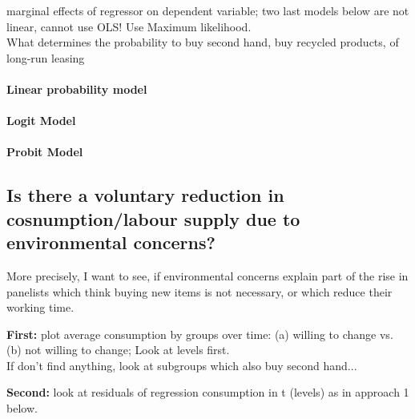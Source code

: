 \documentclass[12pt]{article}
\begin{document}
marginal effects of regressor on dependent variable; two last models below are not linear, cannot use OLS! Use Maximum likelihood. \\
What determines the probability to buy second hand, buy recycled products, of long-run leasing
\paragraph{Linear probability model}
\paragraph{Logit Model}
\paragraph{Probit Model}

\subsection{Is there a voluntary reduction in cosnumption/labour supply due to environmental concerns?}

More precisely, I want to see, if environmental concerns explain part of the rise in panelists which think buying new items is not necessary, or which reduce their working time. 

\textbf{First:} plot average consumption by groups over time: (a) willing to change vs. (b) not willing to change; 
Look at levels first.\\ If don't find anything, look at subgroups which also buy second hand...

\textbf{Second:} look at residuals of regression consumption in t (levels) as in approach 1 below. 
\end{document}
